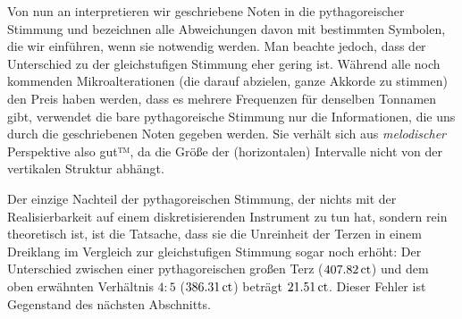 \documentclass[british,11pt]{scrartcl}
\begin{document}
Von nun an interpretieren wir geschriebene Noten in die pythagoreischer
Stimmung und bezeichnen alle Abweichungen davon mit bestimmten Symbolen, die
wir einführen, wenn sie notwendig werden. Man beachte jedoch, dass der
Unterschied zu der gleichstufigen Stimmung eher gering ist.
Während alle noch kommenden Mikroalterationen (die darauf abzielen, ganze
Akkorde zu stimmen) den Preis haben werden, dass es mehrere Frequenzen für
denselben Tonnamen gibt, verwendet die bare pythagoreische Stimmung nur die
Informationen, die uns durch die geschriebenen Noten gegeben werden. Sie verhält
sich aus \emph{melodischer} Perspektive also gut™, da die Größe der 
(horizontalen) Intervalle nicht von der vertikalen Struktur abhängt.

Der einzige Nachteil der pythagoreischen Stimmung, der nichts mit der Realisierbarkeit auf einem diskretisierenden Instrument zu tun hat, sondern rein theoretisch ist, ist die Tatsache, dass sie die Unreinheit der Terzen in einem Dreiklang im Vergleich zur gleichstufigen Stimmung sogar noch erhöht: Der Unterschied zwischen einer pythagoreischen großen Terz ($407.82\,\mathrm{ct}$) und dem oben erwähnten Verhältnis $4:5$ ($386.31\,\mathrm{ct}$) beträgt $21.51\,\mathrm{ct}$. Dieser Fehler ist Gegenstand des nächsten Abschnitts.

\end{document}
